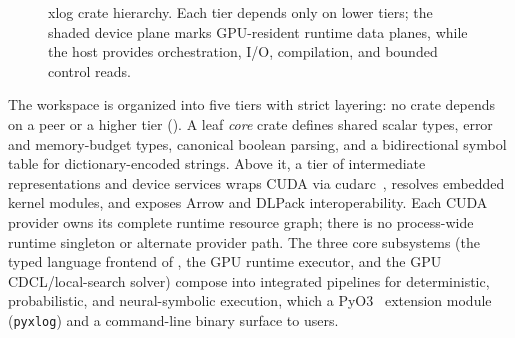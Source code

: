 \begin{figure}[tbp]
  \caption{xlog crate hierarchy. Each tier depends only on lower tiers; the
  shaded device plane marks GPU-resident runtime data planes, while the host
  provides orchestration, I/O, compilation, and bounded control reads.}
  \label{fig:arch}
\end{figure}

The workspace is organized into five tiers with strict layering: no crate depends on a peer or a higher tier (). A leaf \emph{core} crate defines shared scalar types, error and memory-budget types, canonical boolean parsing, and a bidirectional symbol table for dictionary-encoded strings. Above it, a tier of intermediate representations and device services wraps CUDA via cudarc~\cite{cudarc}, resolves embedded kernel modules, and exposes Arrow and DLPack interoperability. Each CUDA provider owns its complete runtime resource graph; there is no process-wide runtime singleton or alternate provider path. The three core subsystems (the typed language frontend of , the GPU runtime executor, and the GPU CDCL/local-search solver) compose into integrated pipelines for deterministic, probabilistic, and neural-symbolic execution, which a PyO3~\cite{pyo3} extension module (\texttt{pyxlog}) and a command-line binary surface to users.

